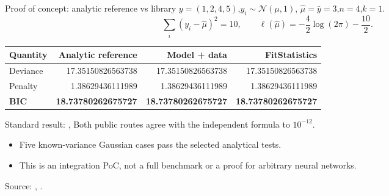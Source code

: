 \documentclass[aspectratio=169,notheorems]{beamer}
\begin{document}
\begin{frame}{Proof of concept: analytic reference vs library}
\small
$y=(1,2,4,5)$,\quad $y_i\sim\mathcal{N}(\mu,1)$,\quad
$\hat\mu=\bar y=3$,\quad $n=4$,\quad $k=1$.
\[
  \sum_i(y_i-\hat\mu)^2=10,\qquad
  \ell(\hat\mu)=-\frac{4}{2}\log(2\pi)-\frac{10}{2}.
\]
\centering
{\footnotesize
\setlength{\tabcolsep}{7pt}
\renewcommand{\arraystretch}{1.22}
\begin{tabular}{@{}lrrr@{}}
\toprule
\textbf{Quantity} & \textbf{Analytic reference}
 & \textbf{Model + data} & \textbf{FitStatistics}\\
\midrule
Deviance & 17.35150826563738 & 17.35150826563738 & 17.35150826563738\\
Penalty  & 1.38629436111989 & 1.38629436111989 & 1.38629436111989\\
\textbf{BIC} & \textbf{18.73780262675727} & \textbf{18.73780262675727} & \textbf{18.73780262675727}\\
\bottomrule
\end{tabular}
}
\par
\smallskip
\begin{block}{Standard result: , }
\small Both public routes agree with the independent formula to $10^{-12}$.
\end{block}
\raggedright
\footnotesize
\begin{itemize}\setlength{\itemsep}{.15em}
  \item Five known-variance Gaussian cases pass the selected analytical tests.
  \item This is an integration PoC, not a full benchmark or a proof for arbitrary neural networks.
\end{itemize}
{\scriptsize Source: , .}
\end{frame}
\end{document}
